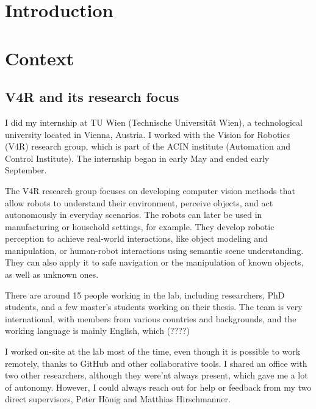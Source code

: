 
\section*{Introduction}



\section{Context}
\subsection{V4R and its research focus}

I did my internship at TU Wien (Technische Universität Wien), a technological university located in Vienna, Austria. I worked with the Vision for Robotics (V4R) research group, which is part of the ACIN institute (Automation and Control Institute). The internship began in early May and ended early September.

The V4R research group focuses on developing computer vision methods that allow robots to understand their environment, perceive objects, and act autonomously in everyday scenarios. The robots can later be used in manufacturing or household settings, for example. They develop robotic perception to achieve real-world interactions, like object modeling and manipulation, or human-robot interactions using semantic scene understanding. They can also apply it to safe navigation or the manipulation of known objects, as well as unknown ones.


There are around 15 people working in the lab, including researchers, PhD students, and a few master's students working on their thesis. The team is very international, with members from various countries and backgrounds, and the working language is mainly English, which  (????)


I worked on-site at the lab most of the time, even though it is possible to work remotely, thanks to GitHub and other collaborative tools. I shared an office with two other researchers, although they were'nt always present, which gave me a lot of autonomy. However, I could always reach out for help or feedback from my two direct supervisors, Peter Hönig and Matthias Hirschmanner.

